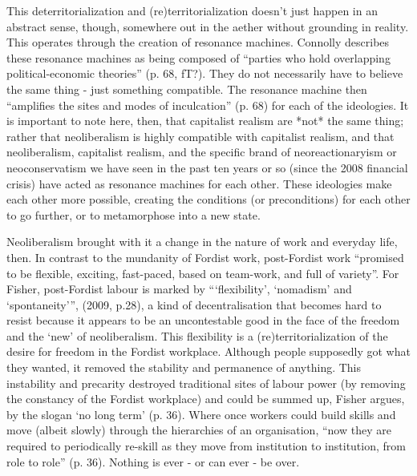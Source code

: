 This deterritorialization and (re)territorialization doesn't just happen
in an abstract sense, though, somewhere out in the aether without
grounding in reality. This operates through the creation of resonance
machines. Connolly describes these resonance machines as being composed
of ``parties who hold overlapping political-economic theories'' (p. 68,
fT?). They do not necessarily have to believe the same thing - just
something compatible. The resonance machine then ``amplifies the sites
and modes of inculcation'' (p. 68) for each of the ideologies. It is
important to note here, then, that capitalist realism are *not* the same
thing; rather that neoliberalism is highly compatible with capitalist
realism, and that neoliberalism, capitalist realism, and the specific
brand of neoreactionaryism or neoconservatism we have seen in the past
ten years or so (since the 2008 financial crisis) have acted as
resonance machines for each other. These ideologies make each other more
possible, creating the conditions (or preconditions) for each other to
go further, or to metamorphose into a new state.

Neoliberalism brought with it a change in the nature of work and
everyday life, then. In contrast to the mundanity of Fordist work,
post-Fordist work ``promised to be flexible, exciting, fast-paced, based
on team-work, and full of variety''. For Fisher, post-Fordist labour is
marked by ```flexibility', `nomadism' and `spontaneity''', (2009, p.28),
a kind of decentralisation that becomes hard to resist because it
appears to be an uncontestable good in the face of the freedom and the
`new' of neoliberalism. This flexibility is a (re)territorialization of
the desire for freedom in the Fordist workplace. Although people
supposedly got what they wanted, it removed the stability and permanence
of anything. This instability and precarity destroyed traditional sites
of labour power (by removing the constancy of the Fordist workplace) and
could be summed up, Fisher argues, by the slogan `no long term' (p. 36).
Where once workers could build skills and move (albeit slowly) through
the hierarchies of an organisation, ``now they are required to
periodically re-skill as they move from institution to institution, from
role to role'' (p. 36). Nothing is ever - or can ever - be over.

